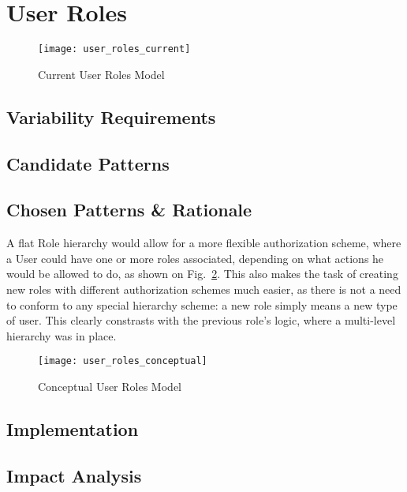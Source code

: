 \section{User Roles}\label{sec:fa_roles}

\begin{figure}[H]
  \centering
  \texttt{[image: user\_roles\_current]}
  \caption{Current User Roles Model}
  \label{fig:user_roles_current}
\end{figure}

\subsection{Variability Requirements}\label{sec:fa_roles_variability_requirements}

\subsection{Candidate Patterns}\label{sec:fa_roles_candidate_patterns}

\subsection{Chosen Patterns \& Rationale}\label{sec:fa_roles_chosen_patterns_rationale}

A flat Role hierarchy would allow for a more flexible authorization scheme, where a User could have one or more roles associated, depending on what actions he would be allowed to do, as shown on Fig.~\ref{fig:user_roles_conceptual}. This also makes the task of creating new roles with different authorization schemes much easier, as there is not a need to conform to any special hierarchy scheme: a new role simply means a new type of user. This clearly constrasts with the previous role's logic, where a multi-level hierarchy was in place.

\begin{figure}[H]
  \centering
  \texttt{[image: user\_roles\_conceptual]}
  \caption{Conceptual User Roles Model}
  \label{fig:user_roles_conceptual}
\end{figure}

\subsection{Implementation}\label{sec:fa_roles_implementation}

\subsection{Impact Analysis}\label{sec:fa_roles_impact_analysis}
